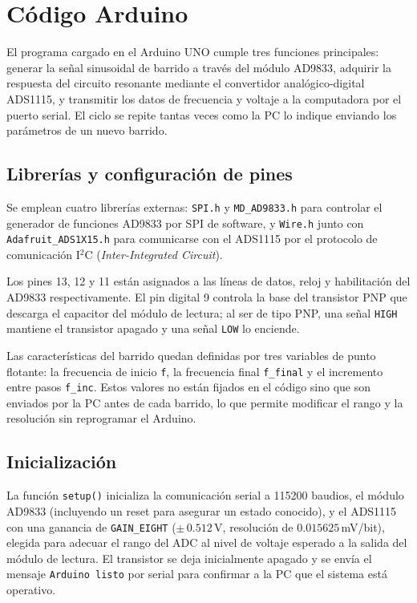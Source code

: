 \chapter{Código Arduino}\label{apx:Arduino}

El programa cargado en el Arduino UNO cumple tres funciones principales: generar la señal sinusoidal de barrido a través del módulo AD9833, adquirir la respuesta del circuito resonante mediante el convertidor analógico-digital ADS1115, y transmitir los datos de frecuencia y voltaje a la computadora por el puerto serial. El ciclo se repite tantas veces como la PC lo indique enviando los parámetros de un nuevo barrido.

\section{Librerías y configuración de pines}

Se emplean cuatro librerías externas: \texttt{SPI.h} y \texttt{MD\_AD9833.h} para controlar el generador de funciones AD9833 por SPI de software, y \texttt{Wire.h} junto con \texttt{Adafruit\_ADS1X15.h} para comunicarse con el ADS1115 por el protocolo de comunicación I$^2$C (\textit{Inter-Integrated Circuit}).

Los pines 13, 12 y 11 están asignados a las líneas de datos, reloj y habilitación del AD9833 respectivamente. El pin digital 9 controla la base del transistor PNP que descarga el capacitor del módulo de lectura; al ser de tipo PNP, una señal \texttt{HIGH} mantiene el transistor apagado y una señal \texttt{LOW} lo enciende.

Las características del barrido quedan definidas por tres variables de punto flotante: la frecuencia de inicio \texttt{f}, la frecuencia final \texttt{f\_final} y el incremento entre pasos \texttt{f\_inc}. Estos valores no están fijados en el código sino que son enviados por la PC antes de cada barrido, lo que permite modificar el rango y la resolución sin reprogramar el Arduino.

\section{Inicialización}

La función \texttt{setup()} inicializa la comunicación serial a 115200 baudios, el módulo AD9833 (incluyendo un reset para asegurar un estado conocido), y el ADS1115 con una ganancia de \texttt{GAIN\_EIGHT} ($\pm\,0.512\,$V, resolución de $0.015625\,$mV/bit), elegida para adecuar el rango del ADC al nivel de voltaje esperado a la salida del módulo de lectura. El transistor se deja inicialmente apagado y se envía el mensaje \texttt{Arduino listo} por serial para confirmar a la PC que el sistema está operativo.

